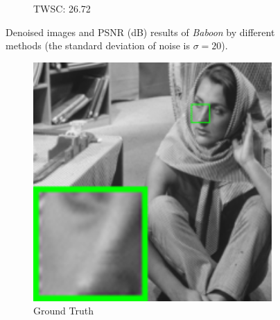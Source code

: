 \begin{figure}
\begin{adjustwidth}{-2cm}{}
\begin{subfigure}[t]{0.19\textwidth}
		\caption{TWSC: 26.72}
    \end{subfigure}
    \caption{Denoised images and PSNR (dB) results of \textsl{Baboon} by different methods (the standard deviation of noise is $\sigma=20$).}
    \label{fig5-2}
\end{adjustwidth}
\end{figure}



\begin{figure}
\begin{adjustwidth}{-2cm}{}
    \centering
    \begin{subfigure}[t]{0.19\textwidth}
        \centering
        \includegraphics[width=1\textwidth]{images/twsc/awgn/resize_br_barbara.png}
	   \caption{Ground Truth}
    \end{subfigure}
    \hfill
    \begin{subfigure}[t]{0.19\textwidth}
        \centering

\end{subfigure}
\end{adjustwidth}
\end{figure}
